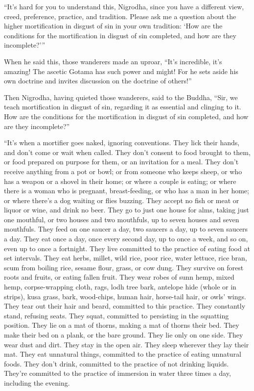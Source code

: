 \documentclass[12pt,openany]{book}%
\begin{document}
“It’s hard for you to understand this, Nigrodha, since you have a different view, creed, preference, practice, and tradition. Please ask me a question about the higher mortification in disgust of sin in your own tradition: ‘How are the conditions for the mortification in disgust of sin completed, and how are they incomplete?’” 

When he said this, those wanderers made an uproar, “It’s incredible, it’s amazing! The ascetic Gotama has such power and might! For he sets aside his own doctrine and invites discussion on the doctrine of others!” 

Then Nigrodha, having quieted those wanderers, said to the Buddha, “Sir, we teach mortification in disgust of sin, regarding it as essential and clinging to it. How are the conditions for the mortification in disgust of sin completed, and how are they incomplete?” 

“It’s when a mortifier goes naked, ignoring conventions. They lick their hands, and don’t come or wait when called. They don’t consent to food brought to them, or food prepared on purpose for them, or an invitation for a meal. They don’t receive anything from a pot or bowl; or from someone who keeps sheep, or who has a weapon or a shovel in their home; or where a couple is eating; or where there is a woman who is pregnant, breast-feeding, or who has a man in her home; or where there’s a dog waiting or flies buzzing. They accept no fish or meat or liquor or wine, and drink no beer. They go to just one house for alms, taking just one mouthful, or two houses and two mouthfuls, up to seven houses and seven mouthfuls. They feed on one saucer a day, two saucers a day, up to seven saucers a day. They eat once a day, once every second day, up to once a week, and so on, even up to once a fortnight. They live committed to the practice of eating food at set intervals. They eat herbs, millet, wild rice, poor rice, water lettuce, rice bran, scum from boiling rice, sesame flour, grass, or cow dung. They survive on forest roots and fruits, or eating fallen fruit. They wear robes of sunn hemp, mixed hemp, corpse-wrapping cloth, rags, lodh tree bark, antelope hide (whole or in strips), kusa grass, bark, wood-chips, human hair, horse-tail hair, or owls’ wings. They tear out their hair and beard, committed to this practice. They constantly stand, refusing seats. They squat, committed to persisting in the squatting position. They lie on a mat of thorns, making a mat of thorns their bed. They make their bed on a plank, or the bare ground. They lie only on one side. They wear dust and dirt. They stay in the open air. They sleep wherever they lay their mat. They eat unnatural things, committed to the practice of eating unnatural foods. They don’t drink, committed to the practice of not drinking liquids. They’re committed to the practice of immersion in water three times a day, including the evening. 
\end{document}
